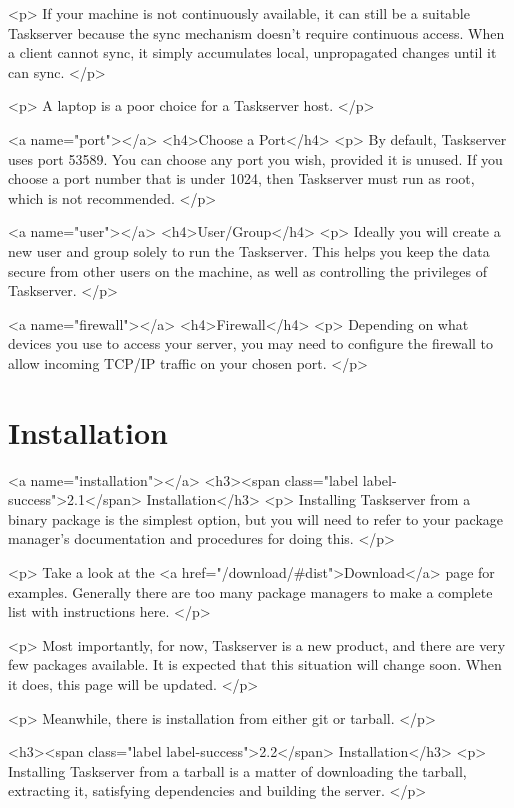 \documentclass[t,handout]{beamer}
\begin{document}
<p>
  If your machine is not continuously available, it can still be a
  suitable Taskserver because the sync mechanism doesn't require
  continuous access. When a client cannot sync, it simply
  accumulates local, unpropagated changes until it can sync.
</p>

<p>
  A laptop is a poor choice for a Taskserver host.
</p>

<a name="port"></a>
<h4>Choose a Port</h4>
<p>
  By default, Taskserver uses port 53589. You can choose any port
  you wish, provided it is unused. If you choose a port number that
  is under 1024, then Taskserver must run as root, which is not
  recommended.
</p>

<a name="user"></a>
<h4>User/Group</h4>
<p>
  Ideally you will create a new user and group solely to run the
  Taskserver. This helps you keep the data secure from other users
  on the machine, as well as controlling the privileges of
  Taskserver.
</p>

<a name="firewall"></a>
<h4>Firewall</h4>
<p>
  Depending on what devices you use to access your server, you may
  need to configure the firewall to allow incoming TCP/IP traffic on
  your chosen port.
</p>


\section{Installation}

<a name="installation"></a>
<h3><span class="label label-success">2.1</span> Installation</h3>
<p>
  Installing Taskserver from a binary package is the simplest
  option, but you will need to refer to your package manager's
  documentation and procedures for doing this.
</p>

<p>
  Take a look at the
  <a href="/download/#dist">Download</a> page
  for examples.  Generally there are too many package managers to
  make a complete list with instructions here.
</p>

<p>
  Most importantly, for now, Taskserver is a new product, and there
  are very few packages available.  It is expected that this
  situation will change soon.  When it does, this page will be updated.
</p>

<p>
  Meanwhile, there is installation from either git or tarball.
</p>


<h3><span class="label label-success">2.2</span> Installation</h3>
<p>
  Installing Taskserver from a tarball is a matter of downloading
  the tarball, extracting it, satisfying dependencies and building
  the server.
</p>
\end{document}
